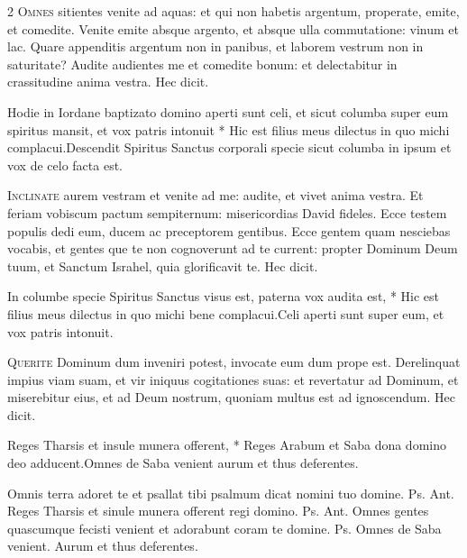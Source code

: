 \begin{multicols*}{2}
\lettrine[lines=2]{\zallmancaps \color{Red} O}{mnes} sitientes venite ad aquas: et qui non habetis argentum, properate, emite, et comedite. Venite emite absque argento, et absque ulla commutatione: vinum et lac. Quare appenditis argentum non in panibus, et laborem vestrum non in saturitate? Audite audientes me et comedite bonum: et delectabitur in crassitudine anima vestra. Hec dicit.
\begin{responsory}
{Hodie in Iordane baptizato domino aperti sunt celi, et sicut columba super eum spiritus mansit, et vox patris intonuit * Hic est filius meus dilectus in quo michi complacui.}{Descendit Spiritus Sanctus corporali specie sicut columba in ipsum et vox de celo facta est.}
\end{responsory}%
\lettrine[lines=2]{\zallmancaps \color{Blue} I}{nclinate} aurem vestram et venite ad me: audite, et vivet anima vestra. Et feriam vobiscum pactum sempiternum: misericordias David fideles. Ecce testem populis dedi eum, ducem ac preceptorem gentibus. Ecce gentem quam nesciebas vocabis, et gentes que te non cognoverunt ad te current: propter Dominum Deum tuum, et Sanctum Israhel, quia glorificavit te. Hec dicit.
\begin{responsory}[in-columbe]
{In columbe specie Spiritus Sanctus visus est, paterna vox audita est, * Hic est filius meus dilectus in quo michi bene complacui.}{Celi aperti sunt super eum, et vox patris intonuit.}
\end{responsory}%
\lettrine[lines=2]{\zallmancaps \color{Red} Q}{uerite} Dominum dum inveniri potest, invocate eum dum prope est. Derelinquat impius viam suam, et vir iniquus cogitationes suas: et revertatur ad Dominum, et miserebitur eius, et ad Deum nostrum, quoniam multus est ad ignoscendum. Hec dicit.
\begin{responsory-doxology}
{Reges Tharsis et insule munera offerent, * Reges Arabum et Saba dona domino deo adducent.}{Omnes de Saba venient aurum et thus deferentes.}
\end{responsory-doxology}%
 Omnis terra adoret te et psallat tibi psalmum dicat nomini tuo domine. {\color{Red} Ps.}  {\color{Red} Ant.} Reges Tharsis et sinule munera offerent regi domino. {\color{Red} Ps.}  {\color{Red} Ant.} Omnes gentes quascumque fecisti venient et adorabunt coram te domine. {\color{Red} Ps.}  \V Omnes de Saba venient. \R Aurum et thus deferentes.

\end{multicols*}
